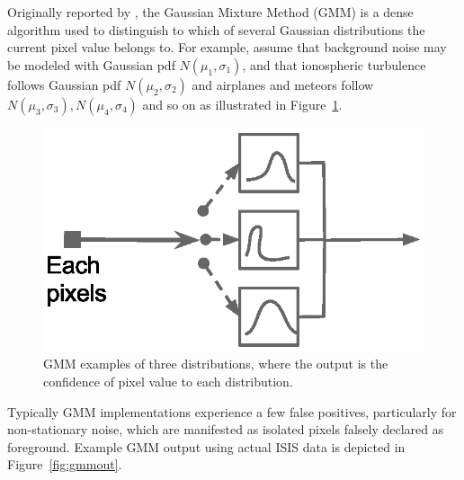 Originally reported by \citet{stauffer1999}, the Gaussian Mixture Method (GMM) is a dense algorithm used to distinguish to which of several Gaussian distributions the current pixel value belongs to.
For example, assume that background noise may be modeled with Gaussian pdf $N(\mu_1,\sigma_1)$, and that ionospheric turbulence follows Gaussian pdf $N(\mu_2,\sigma_2)$ and airplanes and meteors follow $N(\mu_3,\sigma_3), N(\mu_4,\sigma_4)$ and so on as illustrated in Figure~\ref{fig:gmm}.
\begin{figure}\centering
    \includegraphics[width=0.8\linewidth,trim=60 350 420 80,clip]{gfx/gmm}
    \caption{GMM examples of three distributions, where the output is the confidence of pixel value to each distribution.}\label{fig:gmm}
\end{figure}
Typically GMM implementations experience a few false positives, particularly for non-stationary noise, which are manifested as isolated pixels falsely declared as foreground.
Example GMM output using actual ISIS data is depicted in Figure~\ref{fig:gmmout}.
